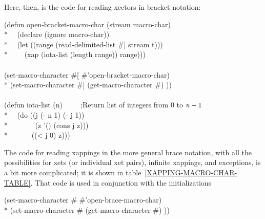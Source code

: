 \begin{defun}[Function]
\begin{new}
Here, then, is the code for reading xectors in bracket notation:
\begin{lisp}
(defun open-bracket-macro-char (stream macro-char) \\*
~~(declare (ignore macro-char)) \\*
~~(let ((range (read-delimited-list \#{\Xbackslash}] stream t))) \\*
~~~~(xap (iota-list (length range)) range))) \\
 \\
(set-macro-character \#{\Xbackslash}[ \#'open-bracket-macro-char) \\*
(set-macro-character \#{\Xbackslash}] (get-macro-character \#{\Xbackslash}) )) \\
 \\
(defun iota-list (n)~~~~~;\textrm{Return list of integers from $0$ to $\emph{n}-1$}\\*
~~(do ((j (- n 1) (- j 1)) \\*
~~~~~~~(z '() (cons j z))) \\*
~~~~~~((< j 0) z)))
\end{lisp}
The code for reading xappings in the more general brace notation, with all the
possibilities for xets (or individual xet pairs), infinite xappings, and exceptions,
is a bit more complicated; it is shown in table~\ref{XAPPING-MACRO-CHAR-TABLE}.
That code is used in conjunction with the initializations
\begin{lisp}
(set-macro-character \#{\Xbackslash}{\Xlbrace} \#'open-brace-macro-char) \\*
(set-macro-character \#{\Xbackslash}{\Xrbrace} (get-macro-character \#{\Xbackslash}) ))
\end{lisp}
\end{new}
\end{defun}


